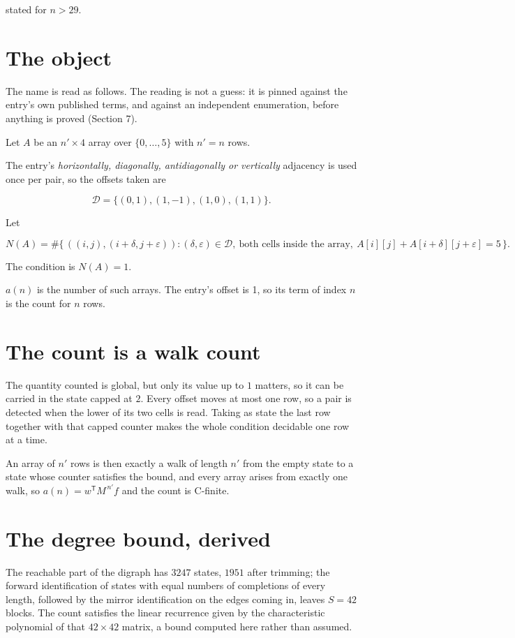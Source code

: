 \documentclass[11pt]{article}
\theoremstyle{definition}
\begin{document}
stated for $n > 29$.

\section{The object}

The name is read as follows. The reading is not a guess: it is pinned against the entry's own published terms, and against an independent enumeration, before anything is proved (Section 7).

Let $A$ be an $n' \times 4$ array over $\{0,\dots,5\}$ with $n' = n$ rows.

The entry's {\itshape horizontally, diagonally, antidiagonally or vertically} adjacency is used once per pair, so the offsets taken are

\[\mathcal{D} = \{(0,1), (1,-1), (1,0), (1,1)\}.\]

Let

\[N(A) = \#\bigl\{\,((i,j),(i{+}\delta,j{+}\varepsilon)) : (\delta,\varepsilon) \in \mathcal{D},\ \text{both cells inside the array},\ A[i][j] + A[i{+}\delta][j{+}\varepsilon] = 5\,\bigr\}.\]

The condition is $N(A) = 1$.

$a(n)$ is the number of such arrays. The entry's offset is 1, so its term of index $n$ is the count for $n$ rows.

\section{The count is a walk count}

The quantity counted is global, but only its value up to $1$ matters, so it can be carried in the state capped at $2$. Every offset moves at most one row, so a pair is detected when the lower of its two cells is read. Taking as state the last row together with that capped counter makes the whole condition decidable one row at a time.

An array of $n'$ rows is then exactly a walk of length $n'$ from the empty state to a state whose counter satisfies the bound, and every array arises from exactly one walk, so $a(n) = w^{\mathsf T}M^{\,n'}f$ and the count is C-finite.

\section{The degree bound, derived}

The reachable part of the digraph has $3247$ states, $1951$ after trimming; the forward identification of states with equal numbers of completions of every length, followed by the mirror identification on the edges coming in, leaves $S = 42$ blocks. The count satisfies the linear recurrence given by the characteristic polynomial of that $42\times42$ matrix, a bound computed here rather than assumed.
\end{document}
